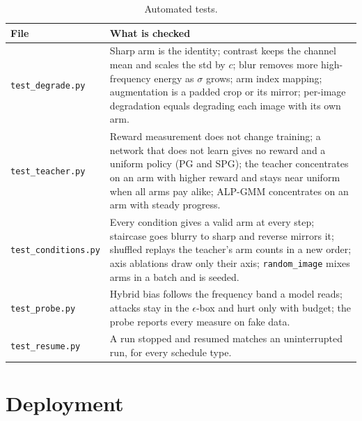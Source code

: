 \documentclass[a4paper,12pt]{report}
\newcommand{\cond}[1]{\texttt{#1}}
\begin{document}
\begin{table}[htbp]
\caption{Automated tests.}
\label{tab:tests}
\begin{center}
\footnotesize
\renewcommand{\arraystretch}{1.0}
\begin{tabular}{|l|P{11cm}|} \hline
\textbf{File} & \textbf{What is checked} \\ \hline
\texttt{test\_degrade.py} & Sharp arm is the identity; contrast keeps the channel mean and scales the std by $c$; blur removes more high-frequency energy as $\sigma$ grows; arm index mapping; augmentation is a padded crop or its mirror; per-image degradation equals degrading each image with its own arm. \\
\texttt{test\_teacher.py} & Reward measurement does not change training; a network that does not learn gives no reward and a uniform policy (PG and SPG); the teacher concentrates on an arm with higher reward and stays near uniform when all arms pay alike; ALP-GMM concentrates on an arm with steady progress. \\
\texttt{test\_conditions.py} & Every condition gives a valid arm at every step; staircase goes blurry to sharp and reverse mirrors it; shuffled replays the teacher's arm counts in a new order; axis ablations draw only their axis; \cond{random\_image} mixes arms in a batch and is seeded. \\
\texttt{test\_probe.py} & Hybrid bias follows the frequency band a model reads; attacks stay in the $\epsilon$-box and hurt only with budget; the probe reports every measure on fake data. \\
\texttt{test\_resume.py} & A run stopped and resumed matches an uninterrupted run, for every schedule type. \\ \hline
\end{tabular}
\end{center}
\end{table}

\section{Deployment}
\end{document}
